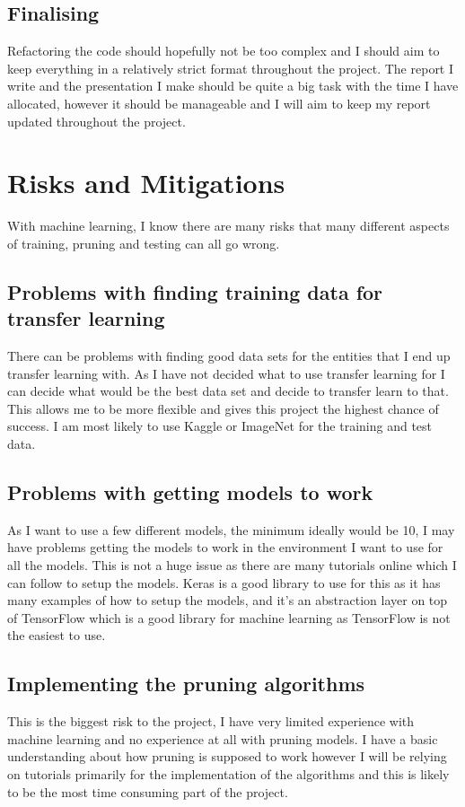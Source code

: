 \documentclass{article}
\begin{document}
\subsection{Finalising}

Refactoring the code should hopefully not be too complex and I should aim to keep everything in a relatively strict format throughout the project. The report I write and the presentation I make should be quite a big task with the time I have allocated, however it should be manageable and I will aim to keep my report updated throughout the project.

\pagebreak
\section{Risks and Mitigations}
With machine learning, I know there are many risks that many different aspects of training, pruning and testing can all go wrong.

\subsection{Problems with finding training data for transfer learning}
There can be problems with finding good data sets for the entities that I end up transfer learning with. 
As I have not decided what to use transfer learning for I can decide what would be the best data 
set and decide to transfer learn to that. This allows me to be more flexible and gives this project the 
highest chance of success. I am most likely to use Kaggle or ImageNet\cite{ImageNet} for the training and test data.


\subsection{Problems with getting models to work}
As I want to use a few different models, the minimum ideally would be 10, I may have 
problems getting the models to work in the environment I want to use for all the models. 
This is not a huge issue as there are many tutorials online which I can follow to setup the models.
Keras is a good library to use for this as it has many examples of how to setup the models,
and it's an abstraction layer on top of TensorFlow\cite{TensorFlow} which is a good library for machine learning
as TensorFlow is not the easiest to use.

\subsection{Implementing the pruning algorithms}
This is the biggest risk to the project, I have very limited experience with machine 
learning and no experience at all with pruning models. I have a basic 
understanding about how pruning is supposed to work however I 
will be relying on tutorials primarily for the implementation of 
the algorithms and this is likely to be the most time consuming part of the project.
\end{document}
